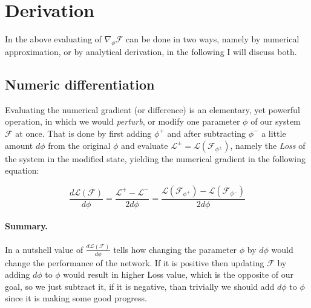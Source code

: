 \section{Derivation} In the above evaluating of $\nabla_\phi \mathcal{F}$ can be done in two ways, namely by numerical approximation, or by analytical derivation, in the following I will discuss both.

\subsection{Numeric differentiation} Evaluating the numerical gradient (or difference) is an elementary, yet powerful operation, in which we would \emph{perturb}, or modify one parameter $\phi$ of our system $\mathcal{F}$ at once.
That is done by first adding $\phi^+$ and after subtracting $\phi^-$ a little amount $d\phi$ from the original $\phi$ and evaluate $\mathcal{L}^{\pm}=\mathcal{L}(\mathcal{F}_{\phi^{\pm}})$, namely the \emph{Loss} of the system in the modified state, yielding the numerical gradient in the following equation:

\begin{equation} \label{eq:numgrad}
    \frac{d\mathcal{L}(\mathcal{F})}{d\phi} = 
    \frac{\mathcal{L}^+ - \mathcal{L}^-}{2 d\phi} = 
    \frac{\mathcal{L}(\mathcal{F}_{\phi^+}) - \mathcal{L}(\mathcal{F}_{\phi^-})}{2 d\phi}
\end{equation}

\paragraph{Summary.} In a nutshell value of $\frac{d\mathcal{L}(\mathcal{F})}{d\phi}$ tells how changing the parameter $\phi$ by $d\phi$ would change the performance of the network. If it is positive then updating $\mathcal{F}$ by adding $d\phi$ to $\phi$ would result in higher Loss value, which is the opposite of our goal, so we just subtract it, if it is negative, than trivially we should add $d\phi$ to $\phi$ since it is making some good progress.

